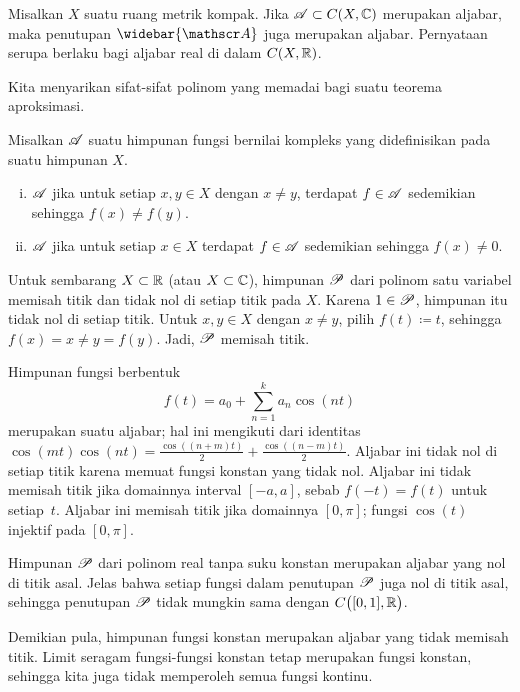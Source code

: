 \begin{prop} \label{prop:closureofalgebra}
Misalkan $X$ suatu ruang metrik kompak. Jika ${\mathscr{A}} \subset C(X,{\mathbb{C}})$ merupakan
aljabar, maka penutupan $\widebar{\sA}$ juga merupakan aljabar. Pernyataan
serupa berlaku bagi aljabar real di dalam $C(X,{\mathbb{R}})$.
\end{prop}

Kita menyarikan sifat-sifat polinom yang memadai bagi suatu teorema
aproksimasi.

\begin{defn}
Misalkan ${\mathscr{A}}$ suatu himpunan fungsi bernilai kompleks yang didefinisikan pada
suatu himpunan $X$.
\begin{enumerate}[(i)]
\item ${\mathscr{A}}$ \emph{} jika untuk setiap $x,y \in X$
dengan $x \neq y$, terdapat $f \in {\mathscr{A}}$ sedemikian sehingga
$f(x) \neq f(y)$.
\item 
${\mathscr{A}}$ \emph{} jika untuk setiap $x \in X$
terdapat $f \in {\mathscr{A}}$ sedemikian sehingga $f(x) \neq 0$.
\end{enumerate}
\end{defn}

\begin{example}
Untuk sembarang $X \subset {\mathbb{R}}$ (atau $X \subset {\mathbb{C}}$), himpunan ${\mathscr{P}}$ dari
polinom satu variabel memisah titik dan tidak nol di setiap titik pada $X$.
Karena $1 \in {\mathscr{P}}$, himpunan itu tidak nol di setiap titik. Untuk
$x,y \in X$ dengan $x \neq y$, pilih $f(t) \coloneqq t$, sehingga
$f(x) = x \neq y = f(y)$. Jadi, ${\mathscr{P}}$ memisah titik.
\end{example}

\begin{example}
Himpunan fungsi berbentuk
\begin{equation*}
f(t) = a_0 + \sum_{n=1}^k a_n \cos(nt)
\end{equation*}
merupakan suatu aljabar; hal ini mengikuti dari identitas
$\cos(mt)\cos(nt) = 
\frac{\cos((n+m) t)}{2}+
\frac{\cos((n-m) t)}{2}$.
Aljabar ini tidak nol di setiap titik karena memuat fungsi konstan yang tidak
nol. Aljabar ini tidak memisah titik jika domainnya interval $[-a,a]$, sebab
$f(-t) = f(t)$ untuk setiap~$t$. Aljabar ini memisah titik jika domainnya
$[0,\pi]$; fungsi $\cos(t)$ injektif pada $[0,\pi]$.
\end{example}

\begin{example}
Himpunan ${\mathscr{P}}$ dari polinom real tanpa suku konstan merupakan aljabar yang nol
di titik asal. Jelas bahwa setiap fungsi dalam penutupan ${\mathscr{P}}$ juga nol di
titik asal, sehingga penutupan ${\mathscr{P}}$ tidak mungkin sama dengan
$C\bigl([0,1],{\mathbb{R}}\bigr)$.

Demikian pula, himpunan fungsi konstan merupakan aljabar yang tidak memisah
titik. Limit seragam fungsi-fungsi konstan tetap merupakan fungsi konstan,
sehingga kita juga tidak memperoleh semua fungsi kontinu.
\end{example}

